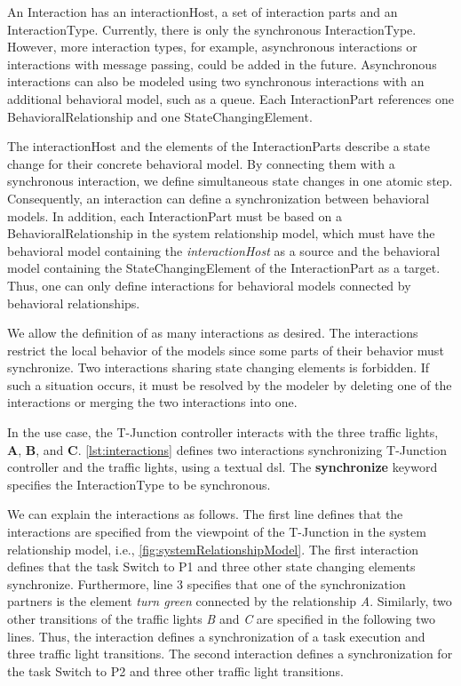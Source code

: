 \documentclass{jot}
\begin{document}
An \textsf{Interaction} has an \textsf{interactionHost}, a set of interaction \textsf{parts} and an \textsf{InteractionType}.
Currently, there is only the \textsf{synchronous} \textsf{InteractionType}.
However, more interaction types, for example, asynchronous interactions or interactions with message passing, could be added in the future.
Asynchronous interactions can also be modeled using two synchronous interactions with an additional behavioral model, such as a queue.
Each \textsf{InteractionPart} references one \textsf{BehavioralRelationship} and one \textsf{StateChangingElement}.

The \textsf{interactionHost} and the elements of the \textsf{InteractionPart}s describe a state change for their concrete behavioral model.
By connecting them with a synchronous interaction, we define simultaneous state changes in one atomic step. 
Consequently, an interaction can define a synchronization between behavioral models.
In addition, each \textsf{InteractionPart} must be based on a \textsf{BehavioralRelationship} in the system relationship model, which must have the behavioral model containing the \textit{interactionHost} as a source and the behavioral model containing the \textsf{StateChangingElement} of the \textsf{InteractionPart} as a target.
Thus, one can only define interactions for behavioral models connected by behavioral relationships.

We allow the definition of as many interactions as desired.
The interactions restrict the local behavior of the models since some parts of their behavior must synchronize.
Two interactions sharing state changing elements is forbidden.
If such a situation occurs, it must be resolved by the modeler by deleting one of the interactions or merging the two interactions into one.

In the use case, the T-Junction controller interacts with the three traffic lights, \textbf{A}, \textbf{B}, and \textbf{C}.
\autoref{lst:interactions} defines two interactions synchronizing T-Junction controller and the traffic lights, using a textual \gls*{dsl}.
The \textbf{synchronize} keyword specifies the \textsf{InteractionType} to be \textsf{synchronous}.



We can explain the interactions as follows.
The first line defines that the interactions are specified from the viewpoint of the T-Junction in the system relationship model, i.e., \autoref{fig:systemRelationshipModel}.
The first interaction defines that the task \textsf{Switch to P1} and three other state changing elements synchronize.
Furthermore, line 3 specifies that one of the synchronization partners is the element \textit{turn green} connected by the relationship \textit{A}.
Similarly, two other transitions of the traffic lights \textit{B} and \textit{
C} are specified in the following two lines.
Thus, the interaction defines a synchronization of a task execution and three traffic light transitions. 
The second interaction defines a synchronization for the task \textsf{Switch to P2} and three other traffic light transitions.
\end{document}
